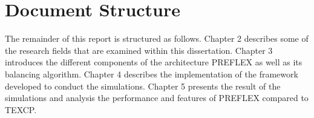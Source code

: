 \section{Document Structure}

The remainder of this report is structured as follows. Chapter 2 describes some of the research fields that are examined within this dissertation. Chapter 3 introduces the different components of the architecture PREFLEX as well as its balancing algorithm. Chapter 4 describes the implementation of the framework  developed to conduct the simulations. Chapter 5 presents the result of the simulations and analysis the performance and features of PREFLEX  compared to TEXCP.
